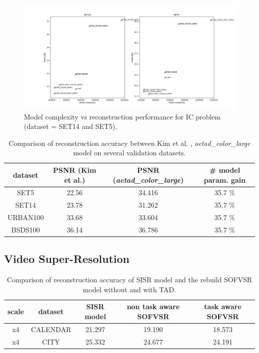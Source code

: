 \begin{figure}[!htbp]
	\centering
	\includegraphics[width=18cm]{figures/psnr_complexity_ic}
	\caption{Model complexity vs reconstruction performance for \ac{IC}
	problem (dataset = SET14 and SET5).}
  \label{fig:psnr_complexity_ic}
\end{figure}

\begin{table}[!htbp]
	\begin{center}
	\begin{tabular}{c|c|c|c}
	dataset & PSNR (Kim et al.) & PSNR (\textit{aetad\_color\_large})
	& \# model param. gain \\
	\hline
  SET5 & 22.56 & 34.416 & 35.7 \%\\
	SET14 & 23.78 & 31.262 & 35.7 \% \\
	URBAN100 & 33.68 & 33.604 & 35.7 \% \\
	BSDS100 & 36.14 & 36.786 & 35.7 \% \\
	\end{tabular}
	\caption{Comparison of reconstruction accuracy between Kim et al. \cite{TAID},
	\textit{aetad\_color\_large} model on several validation datasets. }
	\label{table:icperformance}
	\end{center}
\end{table}

\subsection{Video Super-Resolution}
\label{sec:Experiments_VSR}

\begin{table}[!htbp]
	\begin{center}
	\begin{tabular}{c|c|c|c|c}
	scale & dataset & \ac{SISR} model & non task aware SOFVSR
	& task aware SOFVSR \\
	\hline
  x4 & CALENDAR & 21.297 & 19.190 & 18.573 \\
	x4 & CITY & 25.332 & 24.677 & 24.191 \\
	\end{tabular}
	\caption{Comparison of reconstruction accuracy of \ac{SISR} model and
	the rebuild SOFVSR model without and with \ac{TAD}.}
	\label{table:vsrperformance}
	\end{center}
\end{table}


